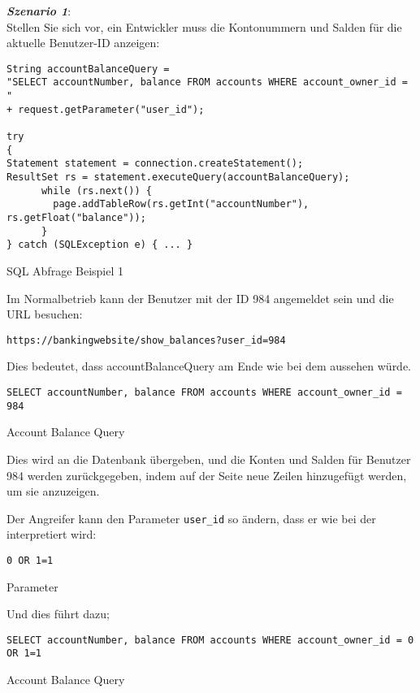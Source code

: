 \textbf{\textit{Szenario 1}}\cite{vcinj16}:\\

Stellen Sie sich vor, ein Entwickler muss die Kontonummern und Salden für die aktuelle Benutzer-ID anzeigen:


\begin{Listing}[h]
	\begin{lstlisting}
String accountBalanceQuery = 
"SELECT accountNumber, balance FROM accounts WHERE account_owner_id = " 
+ request.getParameter("user_id");

try
{
Statement statement = connection.createStatement();
ResultSet rs = statement.executeQuery(accountBalanceQuery);
	  while (rs.next()) {
		page.addTableRow(rs.getInt("accountNumber"), rs.getFloat("balance"));
	  }
} catch (SQLException e) { ... }
	\end{lstlisting}
	\caption{SQL Abfrage Beispiel 1}
	\label{lst:inj1}
\end{Listing}

Im Normalbetrieb kann der Benutzer mit der ID 984 angemeldet sein und die URL besuchen:

\texttt{https://bankingwebsite/show\_balances?user\_id=984}

Dies bedeutet, dass accountBalanceQuery am Ende wie bei dem  aussehen würde.

\begin{Listing}[h]
	\begin{lstlisting}
SELECT accountNumber, balance FROM accounts WHERE account_owner_id = 984
	\end{lstlisting}
	\caption{Account Balance Query}
	\label{lst:inj2}
\end{Listing}

Dies wird an die Datenbank übergeben, und die Konten und Salden für Benutzer 984 werden zurückgegeben, indem auf der Seite neue Zeilen hinzugefügt werden, um sie anzuzeigen.

Der Angreifer kann den Parameter \texttt{user\_id} so ändern, dass er wie bei der  interpretiert wird:

\begin{Listing}[h]
	\begin{lstlisting}
0 OR 1=1
	\end{lstlisting}
	\caption{Parameter}
	\label{lst:inj3}
\end{Listing}

Und dies führt dazu;

\begin{Listing}[h]
	\begin{lstlisting}
SELECT accountNumber, balance FROM accounts WHERE account_owner_id = 0 OR 1=1
	\end{lstlisting}
	\caption{Account Balance Query}
	\label{lst:inj4}
\end{Listing}

